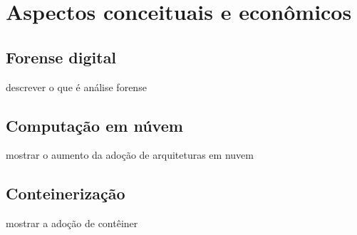 \chapter{Aspectos conceituais e econômicos}

\section{Forense digital}

descrever o que é análise forense

\section{Computação em núvem}

mostrar o aumento da adoção de arquiteturas em nuvem

\section{Conteinerização}

mostrar a adoção de contêiner

